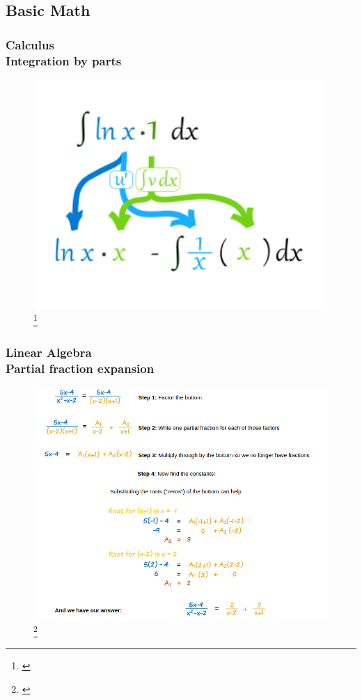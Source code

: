 \documentclass[hyperref={pdfpagelabels=true}]{beamer}
\begin{document}
\subsection{Basic Math}
\begin{frame}
\frametitle{Calculus \\ {\large Integration by parts}}
\begin{figure}[!tbp]
\centering
\includegraphics[scale = 0.35]{figs/Selection_011.png}
\footnote{\href{http://www.mathsisfun.com/calculus/integration-by-parts.html}{}}
\end{figure}
\end{frame}
\begin{frame}
\frametitle{Linear Algebra \\ {\large Partial fraction expansion}}
\begin{figure}[!tbp]
\centering
\includegraphics[scale = 0.3]{figs/Selection_012.png}
\footnote{\href{http://www.mathsisfun.com/calculus/integration-by-parts.html}{}}
\end{figure}
\end{frame}
\end{document}
